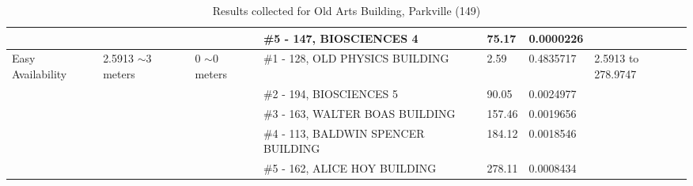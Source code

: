 \begin{table}[H]
{\begin{tabular}{|l|l|l|l|l|l|l|}
                   &                          &                                                 & \#5 - 147, BIOSCIENCES 4                              & 75.17         & 0.0000226       &                           \\ \hline
Easy Availability  & 2.5913 $\sim$3 meters    & 0 $\sim$0  meters                               & \#1 - 128, OLD PHYSICS BUILDING                       & 2.59          & 0.4835717       & 2.5913 to 278.9747        \\ \hline
                   &                          &                                                 & \#2 - 194, BIOSCIENCES 5                              & 90.05         & 0.0024977       &                           \\ \hline
                   &                          &                                                 & \#3 - 163, WALTER BOAS BUILDING                       & 157.46        & 0.0019656       &                           \\ \hline
                   &                          &                                                 & \#4 - 113, BALDWIN SPENCER BUILDING                   & 184.12        & 0.0018546       &                           \\ \hline
                   &                          &                                                 & \#5 - 162, ALICE HOY BUILDING                         & 278.11        & 0.0008434       &                           \\ \hline
\end{tabular}
}
\caption{Results collected for Old Arts Building, Parkville (149)}
\label{appendix:old}
\end{table}

